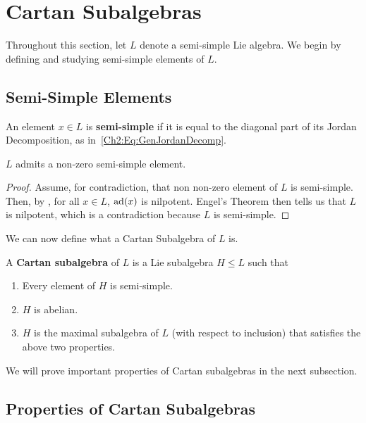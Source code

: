 \section{Cartan Subalgebras}

Throughout this section, let $L$ denote a semi-simple Lie algebra. We begin by defining and studying semi-simple elements of $L$.

\subsection{Semi-Simple Elements}

\begin{boxdefinition}
    An element $x \in L$ is \textbf{semi-simple} if it is equal to the diagonal part of its Jordan Decomposition, as in~\eqref{Ch2:Eq:GenJordanDecomp}.
\end{boxdefinition}

\begin{lemma}\label{Ch3:Lemma:ExistsNeZeroSemiSimple}
    $L$ admits a non-zero semi-simple element.
\end{lemma}
\begin{proof}
    Assume, for contradiction, that non non-zero element of $L$ is semi-simple. Then, by , for all $x \in L$, $\operatorname{ad}\!\left( x \right)$ is nilpotent. Engel's Theorem then tells us that $L$ is nilpotent, which is a contradiction because $L$ is semi-simple. %
\end{proof}

We can now define what a Cartan Subalgebra of $L$ is.

\begin{boxdefinition}
    A \textbf{Cartan subalgebra} of $L$ is a Lie subalgebra $H \leq L$ such that
    \begin{enumerate}[label = \normalfont\arabic*., noitemsep]
        \item Every element of $H$ is semi-simple.
        \item $H$ is abelian.
        \item $H$ is the maximal subalgebra of $L$ (with respect to inclusion) that satisfies the above two properties.
    \end{enumerate}
\end{boxdefinition}

We will prove important properties of Cartan subalgebras in the next subsection.

\subsection{Properties of Cartan Subalgebras}

